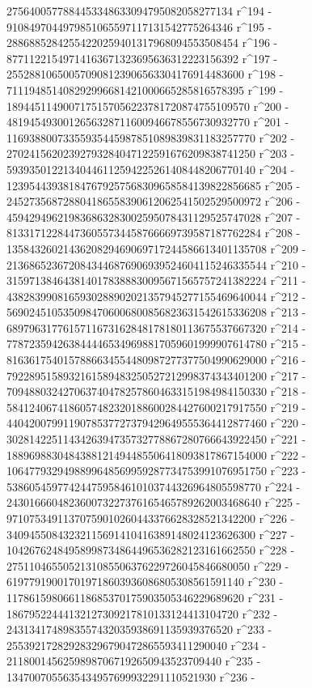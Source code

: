        2756400577884453348633094795082058277134 r^194 - 
       9108497044979851065597117131542775264346 r^195 - 
       28868852842554220259401317968094553508454 r^196 - 
       87711221549714163671323695636312223156392 r^197 - 
       255288106500570908123906563304176914483600 r^198 - 
       711194851408292996681421000665285816578395 r^199 - 
       1894451149007175157056223781720874755109570 r^200 - 
       4819454930012656328711600946678556730932770 r^201 - 
       11693880073355935445987851089839831183257770 r^202 - 
       27024156202392793284047122591676209838741250 r^203 - 
       59393501221340446112594225261408448206770140 r^204 - 
       123954439381847679257568309658584139822856685 r^205 - 
       245273568728804186558390612062541502529500972 r^206 - 
       459429496219836863283002595078431129525747028 r^207 - 
       813317122844736055734458766669739587187762284 r^208 - 
       1358432602143620829469069717244586613401135708 r^209 - 
       2136865236720843446876906939524604115246335544 r^210 - 
       3159713846438140178388830095671565757241382224 r^211 - 
       4382839908165930288902021357945277155469640044 r^212 - 
       5690245105350984706006800856823631542615336208 r^213 - 
       6897963177615711673162848178180113675537667320 r^214 - 
       7787235942638444465349698817059601999907614780 r^215 - 
       8163617540157886634554480987277377504990629000 r^216 - 
       7922895158932161589483250527212998374343401200 r^217 - 
       7094880324270637404782578604633151984984150330 r^218 - 
       5841240674186057482320188600284427600217917550 r^219 - 
       4404200799119078537727379429649555364412877460 r^220 - 
       3028142251143426394735732778867280766643922450 r^221 - 
       1889698830484388121494485506418093817867154000 r^222 - 
       1064779329498899648569959287734753991076951750 r^223 - 
       538605459774244759584610103744326964805598770 r^224 - 
       243016660482360073227376165465789262003468640 r^225 - 
       97107534911370759010260443376628328521342200 r^226 - 
       34094550843232115691410416389148024123626300 r^227 - 
       10426762484958998734864496536282123161662550 r^228 - 
       2751104655052131085506376229726045846680050 r^229 - 
       619779190017019718603936086805308561591140 r^230 - 
       117861598066118685370175903505346229689620 r^231 - 
       18679522444132127309217810133124413104720 r^232 - 
       2431341748983557432035938691135939376520 r^233 - 
       255392172829283296790472865593411290040 r^234 - 
       21180014562598987067192650943523709440 r^235 - 
       1347007055635434957699932291110521930 r^236 - 
